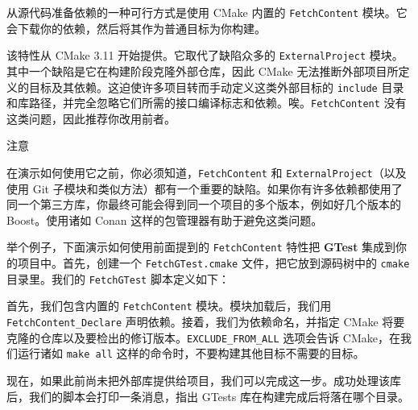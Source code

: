 \label{idx:676}
\label{idx:677}
从源代码准备依赖的一种可行方式是使用 CMake 内置的 \texttt{Fetch\allowbreak{}Content} 模块。它会下载你的依赖，然后将其作为普通目标为你构建。

该特性从 CMake 3.11 开始提供。它取代了缺陷众多的 \texttt{External\allowbreak{}Project} 模块。其中一个缺陷是它在构建阶段克隆外部仓库，因此 CMake 无法推断外部项目所定义的目标及其依赖。这迫使许多项目转而手动定义这类外部目标的 \texttt{include} 目录和库路径，并完全忽略它们所需的接口编译标志和依赖。唉。\texttt{Fetch\allowbreak{}Content} 没有这类问题，因此推荐你改用前者。

\begin{myNotic}{注意}

在演示如何使用它之前，你必须知道，\texttt{Fetch\allowbreak{}Content} 和 \texttt{External\allowbreak{}Project}（以及使用 Git 子模块和类似方法）都有一个重要的缺陷。如果你有许多依赖都使用了同一个第三方库，你最终可能会得到同一个项目的多个版本，例如好几个版本的 Boost。使用诸如 Conan 这样的包管理器有助于避免这类问题。
\end{myNotic}

举个例子，下面演示如何使用前面提到的 \texttt{Fetch\allowbreak{}Content} 特性把 \textbf{GTest} 集成到你的项目中。首先，创建一个 \texttt{Fetch\allowbreak{}GTest.\allowbreak{}cmake} 文件，把它放到源码树中的 \texttt{cmake} 目录里。我们的 \texttt{Fetch\allowbreak{}GTest} 脚本定义如下：


首先，我们包含内置的 \texttt{Fetch\allowbreak{}Content} 模块。模块加载后，我们用 \texttt{Fetch\allowbreak{}Content\_\allowbreak{}Declare} 声明依赖。接着，我们为依赖命名，并指定 CMake 将要克隆的仓库以及要检出的修订版本。\texttt{EXCLUDE\_\allowbreak{}FROM\_\allowbreak{}ALL} 选项会告诉 CMake，在我们运行诸如 \texttt{make all} 这样的命令时，不要构建其他目标不需要的目标。

\label{idx:678}
\label{idx:679}
现在，如果此前尚未把外部库提供给项目，我们可以完成这一步。成功处理该库后，我们的脚本会打印一条消息，指出 GTests 库在构建完成后将落在哪个目录。

